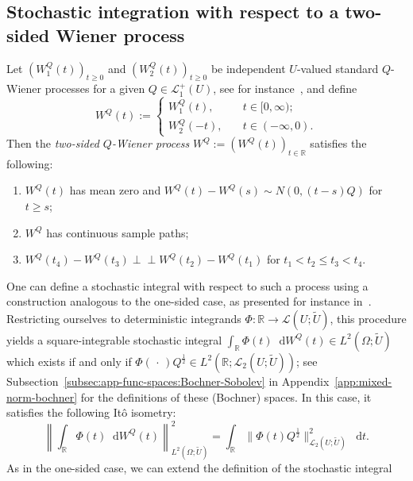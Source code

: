 \documentclass[reqno]{amsart}
\numberwithin{equation}{section}
\newcommand{\bbR}{\mathbb{R}}
\newcommand{\R}{\mathbb{R}}
\newcommand{\norm}[2]{     \| #1       \|_{ #2 }}
\newcommand{\Norm}[2]{\left\| #1 \right\|_{ #2 }}
\newcommand{\rd}{\mathop{}\!\mathrm{d}}
\newcommand{\from}{\colon}
\newcommand{\ind}{\perp\!\!\!\perp}
\newcommand{\LO}{\mathscr L}
\theoremstyle{remark}
\theoremstyle{definition}
\begin{document}
\subsection{Stochastic integration with respect to a two-sided Wiener process}
\label{subsec:prelims:stochastic-int-twosided-Wiener}

Let $(W_{1}^Q(t))_{t\ge0}$ and $(W_{2}^Q(t))_{t\ge0}$
be independent $U$-valued standard $Q$-Wiener processes for a given $Q \in \LO_1^+(U)$,
see for instance~\cite[Section~2.1]{LiuRockner2015}, and define
%
\[
W^Q(t) := \begin{cases}
	W_1^Q(t), &\quad t \in [0,\infty); \\
	W_2^Q(-t), &\quad t \in (-\infty, 0).
\end{cases}
\]
%
Then the \emph{two-sided $Q$-Wiener process} $W^Q := (W^Q(t))_{t\in\R}$ satisfies the following:
%
\begin{enumerate}[label=(WP\arabic{*})]
	\item \label{item:WP1}
	$W^Q(t)$ has mean zero and
	$W^Q(t)-W^Q(s) \sim N(0, (t-s)Q)$ for $t \ge s$;
	\item $W^Q$ has continuous sample paths;
	\item  \label{item:WP3} 
	$W^Q(t_4) - W^Q(t_3) \ind W^Q(t_2) - W^Q(t_1)$ for
	$t_1 < t_2 \le t_3 < t_4$.
\end{enumerate}
%
One can 
define a stochastic integral with respect to such a process
using a construction analogous to the one-sided case, as presented for instance in~\cite[Section~2.3]{LiuRockner2015}.
Restricting ourselves to deterministic integrands $\Phi \from \R \to \LO(U; \widetilde U)$, 
this procedure yields a square-integrable stochastic integral
$\int_{\bbR} \Phi(t) \rd W^Q(t) \in L^2(\Omega; \widetilde U)$
which exists if and only if
$\Phi(\,\cdot\,)Q^\frac{1}{2} \in L^2(\bbR; \mathscr L_2(U; \widetilde U))$; 
see Subsection~\ref{subsec:app-func-spaces:Bochner-Sobolev} in Appendix~\ref{app:mixed-norm-bochner} 
for the definitions of these (Bochner) spaces.
In this case, it satisfies the following It\^o isometry:
%
\begin{equation}\label{eq:ito-R}
	\Norm{\int_{\bbR} \Phi(t) \rd W^Q(t)}{L^2(\Omega; \widetilde U)}^2 
	=
	\int_{\bbR} \norm{\Phi(t)Q^\frac{1}{2}}{\mathscr L_2(U; \widetilde U)}^2 \rd t.
\end{equation}
%
As in the one-sided case, we can extend the definition of the stochastic integral
\end{document}
